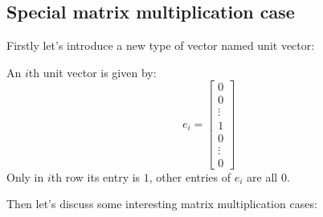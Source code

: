\subsection{Special matrix multiplication case}
Firstly let's introduce a new type of vector named unit vector:
\begin{definition}
An $i$th unit vector is given by:
\[
e_i = \begin{bmatrix}
0\\0\\ \vdots \\ 1 \\ 0 \\ \vdots \\ 0
\end{bmatrix}
\]
Only in $i$th row its entry is $1$, other entries of $e_i$ are all $0$.
\end{definition}
Then let's discuss some interesting matrix multiplication cases:
